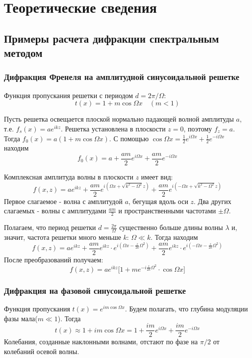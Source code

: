 \documentclass[a4paper,12pt]{article}
\begin{document}
\section{Теоретические сведения}

\subsection{Примеры расчета дифракции спектральным методом}

\subsubsection{Дифракция Френеля на амплитудной синусоидальной решетке}
Функция пропускания решетки с периодом $d=2\pi/\Omega$:
$$
t(x) = 1+m\cos{\Omega x} \quad (m < 1)
$$

Пусть решетка освещается плоской нормально падающей волной амплитуды $a$, т.е. $f_s(x)=ae^{ikz}$. Решетка установлена в плоскости $z=0$, поэтому $f_z=a$. Тогда $f_0(x) = a(1+m\cos{\Omega x})$. С помощью $\cos{\Omega x}=\frac{1}{2}e^{i\Omega x} + \frac{1}{2}e^{-i\Omega x}$ находим
$$
f_0(x) = a+\frac{am}{2}e^{i\Omega x} + \frac{am}{2}e^{-i\Omega x}
$$

Комплексная амплитуда волны в плоскости $z$ имеет вид:
$$
f(x,z)=ae^{ikz} + \frac{am}{2}e^{i(\Omega x + \sqrt{k^2-\Omega^2}z)} + \frac{am}{2}e^{i(-\Omega x+\sqrt{k^2-\Omega^2}z)}
$$
Первое слагаемое - волна с амплитудой $a$, бегущая вдоль оси $z$. Два других слагаемых - волны с амплитудами $\frac{am}{2}$ и пространственными частотами $\pm\Omega$. 

Полагаем, что период решетки $d = \frac{2\pi}{\Omega}$ существенно больше длины волны $\lambda$ и, значит, частота решетки много меньше $k$: $\Omega \ll k$. Тогда находим
$$
f(x,z)=ae^{ikz}+\frac{am}{2}e^{ikz} \cdot e^{i(\Omega x - \frac{z}{2k}\Omega^2)} + \frac{am}{2}e^{ikz}\cdot e^{i(-\Omega x-\frac{z}{2k}\Omega^2)}
$$
После преобразований получаем:
$$
f(x,z) = ae^{ikz}\Big[1+me^{-i\frac{z}{2k}\Omega^2}\cdot\cos{\Omega x}\Big]
$$

\subsubsection{Дифракция на фазовой синусоидальной решетке}
Функция пропускания $t(x)=e^{im\cos{\Omega x}}$. Будем полагать, что глубина модуляции фазы мала($m\ll 1$). Тогда
$$
t(x)\approx 1+im\cos{\Omega x}=1+\frac{im}{2}e^{i\Omega x} +\frac{im}{2}e^{-i\Omega x}
$$
Колебания, созданные наклонными волнами, отстают по фазе на $\pi/2$ от колебаний осевой волны.
\end{document}
